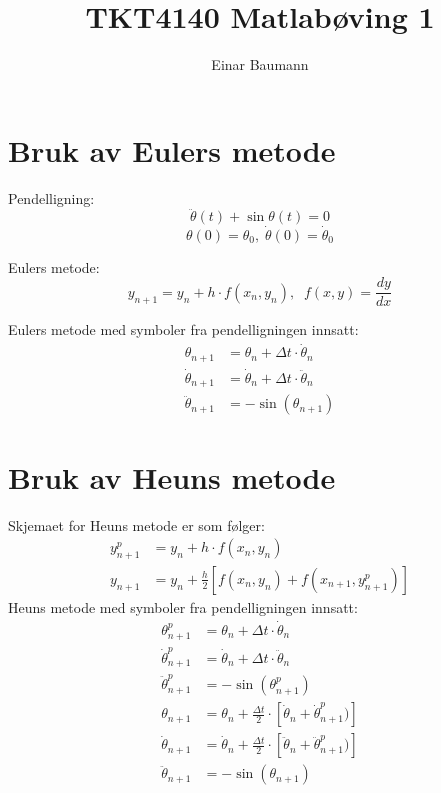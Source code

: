 



\author{Einar Baumann}
\title{TKT4140 Matlabøving 1}
\maketitle

\section{Bruk av Eulers metode} %
\label{sec:bruk_av_eulers_metode}
Pendelligning:
\begin{equation}
  \label{eq:pendulum}
  \ddot{\theta}(t) + \sin \theta(t) = 0
\end{equation}
\begin{equation}
  \nonumber
  \theta(0) = \theta_0, \; \dot{\theta}(0) = \dot{\theta}_0
\end{equation}

\noindent Eulers metode:
\begin{equation}
  y_{n+1} = y_n + h \cdot f(x_n, y_n), \;\; f(x,y) = \frac{dy}{dx}
\end{equation}

\noindent Eulers metode med symboler fra pendelligningen innsatt:
\begin{align}
  \theta_{n+1}        &= \theta_n + \Delta t \cdot \dot{\theta}_n \\
  \dot{\theta}_{n+1}  &= \dot{\theta}_n + \Delta t \cdot \ddot{\theta}_n \\
  \ddot{\theta}_{n+1} &= - \sin (\theta_{n+1})
\end{align}



\section{Bruk av Heuns metode} %
\label{sec:bruk_av_heuns_metode}
Skjemaet for Heuns metode er som følger:
\begin{align}
  y_{n+1}^p &=  y_n + h \cdot f(x_n,y_n) \\
  y_{n+1}   &=  y_n + \frac{h}{2} \left[f(x_n,y_n)+f(x_{n+1},y_{n+1}^p)\right]
\end{align}
Heuns metode med symboler fra pendelligningen innsatt:
\begin{align}
  \theta_{n+1}^p &= \theta_n + \Delta t \cdot \dot\theta_n \\
  \dot\theta_{n+1}^p &= \dot\theta_n + \Delta t \cdot \ddot\theta_n \\
  \ddot\theta_{n+1}^p &= -\sin (\theta_{n+1}^p) \\                   
  \theta_{n+1}     &= \theta_n + \frac{\Delta t}{2} \cdot 
                      \left[\dot\theta_n+\dot\theta_{n+1}^p)\right] \\
  \dot\theta_{n+1} &= \dot\theta_n + \frac{\Delta t}{2} \cdot 
                      \left[\ddot\theta_n+\ddot\theta_{n+1}^p)\right] \\
  \ddot\theta_{n+1} &= -\sin (\theta_{n+1})                   
\end{align}


